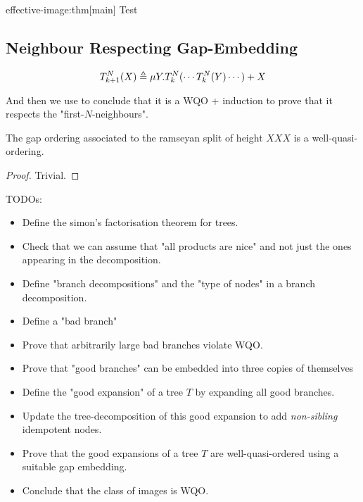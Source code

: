 \begin{proofof}{effective-image:thm}[main]
    Test
\end{proofof}

\subsection{Neighbour Respecting Gap-Embedding}

\begin{equation*}
    T_{k+1}^N (X) \triangleq
    \mu Y. T_{k}^N( \cdots T_k^N(Y) \cdots ) + X
\end{equation*}

And then we use \cite{LOPEZ23} to conclude that it is a WQO + induction 
to prove that it respects the "first-$N$-neighbours".
\begin{lemma}
    The gap ordering associated to the ramseyan split of height $XXX$ is a well-quasi-ordering.
\end{lemma}
\begin{proof}
    Trivial. 
\end{proof}

TODOs:
\begin{itemize}
    \item Define the simon's factorisation theorem for trees.
    \item Check that we can assume that "all products are nice" and not just the ones
        appearing in the decomposition.
    \item Define "branch decompositions" and the "type of nodes" in a branch decomposition.
    \item Define a "bad branch"
    \item Prove that arbitrarily large bad branches violate WQO.
    \item Prove that "good branches" can be embedded into three copies of themselves
    \item Define the "good expansion" of a tree $T$ by expanding all good branches.
    \item Update the tree-decomposition of this good expansion to add \emph{non-sibling}
        idempotent nodes.
    \item Prove that the good expansions of a tree $T$ are well-quasi-ordered using a 
        suitable gap embedding.
    \item Conclude that the class of images is WQO.
\end{itemize}

